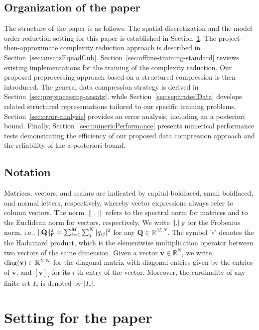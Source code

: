 \documentclass[onefignum,onetabnum]{siamart251104}
\newcommand{\bv}[1]{{\mathbf #1}}
\newcommand{\bt}[1]{{\mathbf{#1}}}
\newcommand{\R}{\mathbb{R}}
\newcommand{\mydiag}{\rm{diag}}
\begin{document}
\subsection*{Organization of the paper} %
The structure of the paper is as follows. The spatial discretization and the model order reduction setting for this paper is established in Section~\ref{sec:motivSetting}. The project-then-approximate complexity reduction approach is described in Section~\ref{sec:ansatzEquadCub}. Section~\ref{sec:offline-training-standard} reviews existing implementations for the training of the complexity reduction. Our proposed preprocessing approach based on a structured compression is then introduced. The general data compression strategy is derived in Section~\ref{sec:preprocessing-ansatz}, while Section~\ref{sec:separatedData} develops related structured representations tailored to our specific training problems. Section~\ref{sec:error-analysis} provides an error analysis, including an a posteriori bound. Finally, Section~\ref{sec:numericPerformance} presents numerical performance tests demonstrating the efficiency of our proposed data compression approach and the reliability of the a posteriori bound.

\subsection*{Notation}
Matrices, vectors, and scalars are indicated by capital boldfaced, small boldfaced, and normal letters, respectively, whereby vector expressions
always refer to column vectors. The norm $\|.\|$ refers to the spectral norm for matrices and to the Euclidean norm for vectors, respectively. 
We write $\|.\|_{\rm{F}}$ for the Frobenius norm, i.e., $\| \bt{Q} \|_{\rm{F}}^2 = { \sum_{i=1}^M \sum_j^N  |q_{ij}|^2}$ for any $\bt{Q}\in \R^{M,N}$.
The symbol '$\circ$' denotes the the Hadamard product, which is the elementwise multiplication operator between two vectors of the same dimension.
Given a vector $\bv{v}\in \R^N$, we write $\mydiag(\bv{v}) \in \R^{N,N}$ for the diagonal matrix with diagonal entries given by the entries of $\bv{v}$, and $[\bv{v}]_i$ for its $i$-th entry of the vector. Moreover, the cardinality of any finite set $I_c$ is denoted by $|I_c|$.


\section{Setting for the paper}\label{sec:motivSetting}
\end{document}
